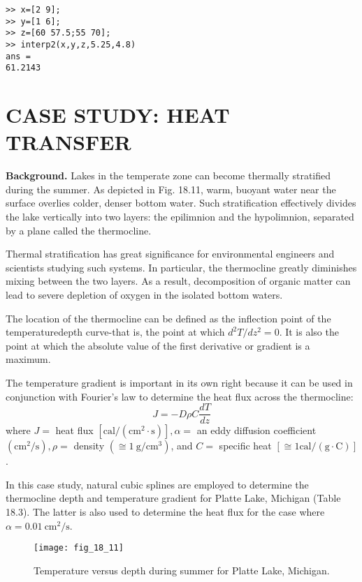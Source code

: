 \documentclass[../main.tex]{subfiles}
\begin{document}
\begin{lstlisting}[numbers=none]
>> x=[2 9];
>> y=[1 6];
>> z=[60 57.5;55 70];
>> interp2(x,y,z,5.25,4.8)
ans =
61.2143
\end{lstlisting}

\section{CASE STUDY: HEAT TRANSFER}

\noindent \textbf{Background.}
Lakes in the temperate zone can become thermally stratified during the summer. As depicted in Fig. 18.11, warm, buoyant water near the surface overlies colder, denser bottom water. Such stratification effectively divides the lake vertically into two layers: the epilimnion and the hypolimnion, separated by a plane called the thermocline.

Thermal stratification has great significance for environmental engineers and scientists studying such systems. In particular, the thermocline greatly diminishes mixing between the two layers. As a result, decomposition of organic matter can lead to severe depletion of oxygen in the isolated bottom waters.

The location of the thermocline can be defined as the inflection point of the temperaturedepth curve-that is, the point at which $d^{2} T / d z^{2}=0$. It is also the point at which the absolute value of the first derivative or gradient is a maximum.

The temperature gradient is important in its own right because it can be used in conjunction with Fourier's law to determine the heat flux across the thermocline:
\begin{equation}
    \tag{18.33}
J=-D \rho C \frac{d T}{d z}
\end{equation}
where $J=$ heat flux $\left[\mathrm{cal} /\left(\mathrm{cm}^{2} \cdot \mathrm{s}\right)\right], \alpha=$ an eddy diffusion coefficient $\left(\mathrm{cm}^{2} / \mathrm{s}\right), \rho=$ density $\left(\cong 1 \mathrm{~g} / \mathrm{cm}^{3}\right)$, and $C=$ specific heat $[\cong 1 \mathrm{cal} /(\mathrm{g} \cdot \mathrm{C})]$.

In this case study, natural cubic splines are employed to determine the thermocline depth and temperature gradient for Platte Lake, Michigan (Table 18.3). The latter is also used to determine the heat flux for the case where $\alpha=0.01 \mathrm{~cm}^{2} / \mathrm{s}$.

\begin{figure}[H]
    \centering
    \texttt{[image: fig\_18\_11]}
   \caption{\textsf{Temperature versus depth during summer for Platte Lake, Michigan.
   }}\label{fig:fig_18_11}
\end{figure}
\end{document}
